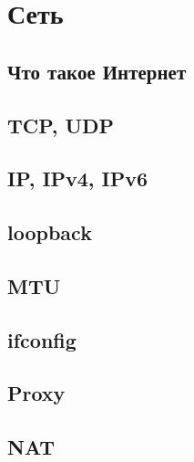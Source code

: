 \section{Сеть}
\subsection{Что такое Интернет}
\subsection{TCP, UDP}
\subsection{IP, IPv4, IPv6}
\subsection{loopback}
\subsection{MTU}
\subsection{ifconfig}
\subsection{Proxy}
\subsection{NAT}
\newpage
